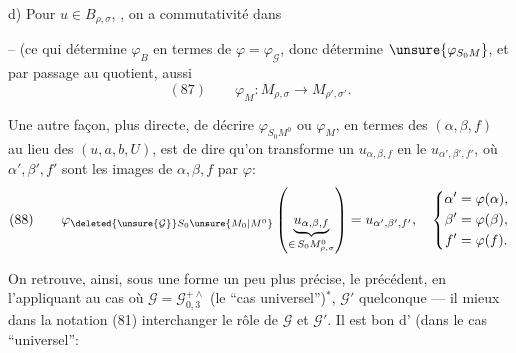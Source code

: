 d) Pour $u\in B_{\rho,\sigma}$,  , on a commutativité dans


-- (ce qui détermine $\varphi_B$ en termes de $\varphi=\varphi_{\mathcal G}$, donc  détermine $\unsure{\varphi_{S_0M}}$, et par passage au quotient, aussi
\[
 (87)\qquad \varphi_M:M_{\rho,\sigma}\longrightarrow M_{\rho',\sigma'}.
\]

Une autre façon, plus directe, de décrire $\varphi_{S_0M^0}$ ou $\varphi_M$, en termes des   $(\alpha,\beta,f)$ au lieu des $(u,a,b,U)$, est de dire qu'on  transforme un $u_{\alpha,\beta,f}$ en le $u_{\alpha',\beta',f'}$, où $\alpha',\beta',f'$ sont les images de $\alpha,\beta,f$ par $\varphi$:
\[
 (88)\qquad
 \varphi_{\deleted{\unsure{\mathcal G}}S_0\unsure{M_0|M^0}}
 \left(\underbrace{u_{\alpha,\beta,f}}_{\in\,S_0M^0_{\rho,\sigma}}\right)
 =u_{\alpha',\beta',f'},\quad
 \left\{\begin{aligned}
 \alpha'&=\varphi(\alpha),\\
 \beta'&=\varphi(\beta),\\
 f'&=\varphi(f).
 \end{aligned}\right.
\]

On retrouve, ainsi, sous une forme un peu plus précise, le  précédent, en  l'appliquant au cas où $\mathcal G=\mathcal G_{0,3}^{+\wedge}$ (le ``cas universel'')$^*$, $\mathcal G'$ quelconque --- il  mieux dans la notation (81) interchanger le rôle de $\mathcal G$ et $\mathcal G'$.
Il est bon d' (dans le cas ``universel'':

